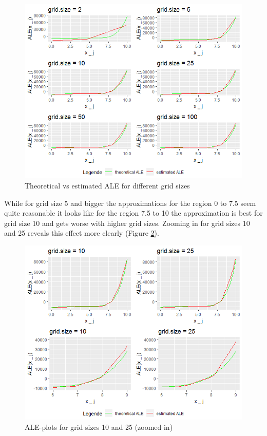 \documentclass[]{krantz}
\begin{document}
\begin{figure}
\includegraphics[width=1\linewidth]{images/ALE_2_example2_6plots_} \caption{Theoretical vs estimated ALE for different grid sizes}\label{fig:exampleALE2}
\end{figure}



While for grid size 5 and bigger the approximations for the region 0 to
7.5 seem quite reasonable it looks like for the region 7.5 to 10 the
approximation is best for grid size 10 and gets worse with higher grid
sizes. Zooming in for grid sizes 10 and 25 reveals this effect more
clearly (Figure \ref{fig:exampleALE2a}).

\begin{figure}
\includegraphics[width=1\linewidth]{images/ALE_2_example2_zoom_} \caption{ALE-plots for grid sizes 10 and 25 (zoomed in)}\label{fig:exampleALE2a}
\end{figure}
\end{document}
